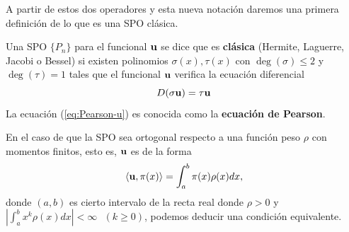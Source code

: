 A partir de estos dos operadores y esta nueva notación daremos una primera definición de lo que es una SPO clásica.

\begin{definicion}
    \label{def:SPO-clasica}
    Una SPO $\{P_n  \}$ para el funcional $\mathbf{u}$ se dice que es \textbf{clásica} (Hermite, Laguerre, Jacobi o Bessel) si existen polinomios $\sigma(x), \tau(x)$ con $\deg(\sigma)\leq 2$ y $\deg(\tau)= 1$ tales que el funcional $\mathbf{u}$ verifica la ecuación diferencial
    \begin{equation}
        \label{eq:Pearson-u}
        D(\sigma \mathbf{u}) = \tau \mathbf{u}
    \end{equation}   
    La ecuación (\ref{eq:Pearson-u}) es conocida como la \textbf{ecuación de Pearson}.
\end{definicion}

En el caso de que la SPO sea ortogonal respecto a una función peso $\rho$ con momentos finitos, esto es, $\mathbf{u}$ es de la forma
\begin{equation}
    \label{eq:funcional-peso}
    \left\langle \mathbf{u} , \pi(x) \right\rangle = \int_a^b \pi(x)\rho(x)dx,
\end{equation}
donde $(a,b)$ es cierto intervalo de la recta real donde $\rho > 0$ y $\left|\int_a^b x^k \rho(x)dx\right| < \infty \ \ \ (k\geq 0)$, podemos deducir una condición equivalente.

